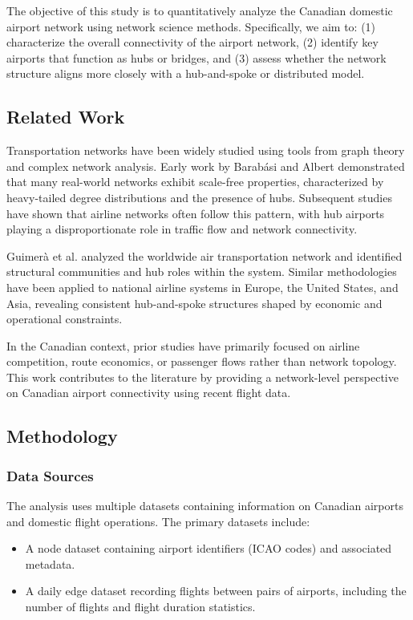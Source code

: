 \documentclass{article}
\begin{document}
The objective of this study is to quantitatively analyze the Canadian domestic airport network using network science methods. Specifically, we aim to:
(1) characterize the overall connectivity of the airport network,
(2) identify key airports that function as hubs or bridges, and
(3) assess whether the network structure aligns more closely with a hub-and-spoke or distributed model.

\subsection{Related Work}
Transportation networks have been widely studied using tools from graph theory and complex network analysis. Early work by Barabási and Albert demonstrated that many real-world networks exhibit scale-free properties, characterized by heavy-tailed degree distributions and the presence of hubs. Subsequent studies have shown that airline networks often follow this pattern, with hub airports playing a disproportionate role in traffic flow and network connectivity.

Guimerà et al. analyzed the worldwide air transportation network and identified structural communities and hub roles within the system. Similar methodologies have been applied to national airline systems in Europe, the United States, and Asia, revealing consistent hub-and-spoke structures shaped by economic and operational constraints.

In the Canadian context, prior studies have primarily focused on airline competition, route economics, or passenger flows rather than network topology. This work contributes to the literature by providing a network-level perspective on Canadian airport connectivity using recent flight data.

\subsection{Methodology}

\subsubsection{Data Sources}
The analysis uses multiple datasets containing information on Canadian airports and domestic flight operations. The primary datasets include:
\begin{itemize}
    \item A node dataset containing airport identifiers (ICAO codes) and associated metadata.
    \item A daily edge dataset recording flights between pairs of airports, including the number of flights and flight duration statistics.
\end{itemize}
\end{document}
